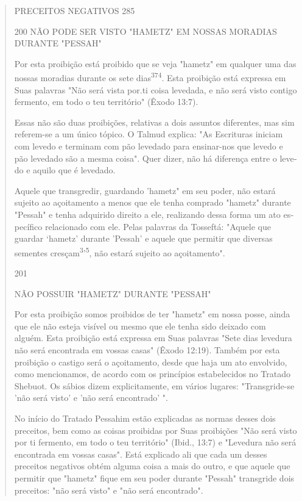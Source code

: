 \begin{quote}
PRECEITOS NEGATIVOS 285

200 NÃO PODE SER VISTO "HAMETZ" EM NOSSAS MORADIAS DURANTE "PESSAH"

Por esta proibição está proibido que se veja "hametz" em qualquer uma
das nossas moradias durante os sete dias\textsuperscript{374}. Esta
proibição está expressa em Suas palavras "Não será vista por.ti coisa
levedada, e não será visto contigo fermento, em todo o teu território"
(Êxodo 13:7).

Essas não são duas proibições, relativas a dois assuntos diferentes, mas
sim referem-se a um único tópico. O Talmud explica: "As Escrituras
ini­ciam com levedo e terminam com pão levedado para ensinar-nos que
levedo e pão levedado são a mesma coisa". Quer dizer, não há diferença
entre o leve­do e aquilo que é levedado.

Aquele que transgredir, guardando 'hametz" em seu poder, não es­tará
sujeito ao açoitamento a menos que ele tenha comprado "hametz" duran­te
"Pessah" e tenha adquirido direito a ele, realizando dessa forma um ato
es­pecífico relacionado com ele. Pelas palavras da Tosseftá: "Aquele que
guardar `hametz' durante 'Pessah' e aquele que permitir que diversas
sementes cresçam\textsuperscript{3}'\textsuperscript{5}, não estará
sujeito ao açoitamento".

201

NÃO POSSUIR "HAMETZ" DURANTE "PESSAH"

Por esta proibição somos proibidos de ter "hametz" em nossa pos­se,
ainda que ele não esteja visível ou mesmo que ele tenha sido deixado com
alguém. Esta proibição está expressa em Suas palavras "Sete dias
levedura não será encontrada em vossas casas" (Êxodo 12:19). Também por
esta proibição o castigo será o açoitamento, desde que haja um ato
envolvido, como mencio­namos, de acordo com os princípios estabelecidos
no Tratado Shebuot. Os sá­bios dizem explicitamente, em vários lugares:
"Transgride-se 'não será visto' e 'não será encontrado' ".

No início do Tratado Pessahim estão explicadas as normas desses dois
preceitos, bem como as coisas proibidas por Suas proibições "Não será
visto por ti fermento, em todo o teu território" (Ibid., 13:7) e
"Levedura não será encontrada em vossas casas". Está explicado ali que
cada um desses preceitos negativos obtém alguma coisa a mais do outro, e
que aquele que permitir que "hametz" fique em seu poder durante "Pessah"
transgride dois preceitos: "não será visto" e "não será encontrado".
\end{quote}


